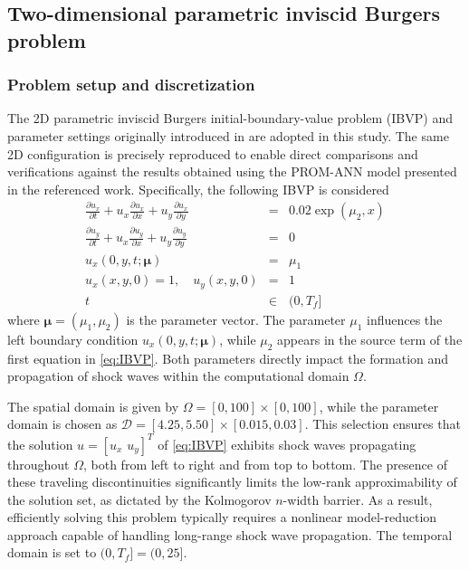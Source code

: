 \documentclass[preprint,10pt]{elsarticle}
\begin{document}
\subsection{Two-dimensional parametric inviscid Burgers problem}
\label{sec:Burgers}

\subsubsection{Problem setup and discretization}

The 2D parametric inviscid Burgers initial-boundary-value problem (IBVP) and parameter settings originally introduced in \cite{barnett2023neural} are adopted in 
this study. The same 2D configuration is precisely reproduced to enable direct comparisons and verifications against the results obtained using the PROM-ANN model presented in 
the referenced work. Specifically, the following IBVP is considered
\begin{eqnarray}
	\label{eq:IBVP}
	\frac{\partial u_x}{\partial t} + u_x\frac{\partial u_x}{\partial x} + u_y \frac{\partial u_x}{\partial y} &=& 0.02 \exp(\mu_2 ,x)
	\nonumber\\
	\frac{\partial u_y}{\partial t} + u_x\frac{\partial u_y}{\partial x} + u_y \frac{\partial u_y}{\partial y} &=& 0
	\\
	u_x(0, y, t; \boldsymbol{\mu}) &=& \mu_1 \nonumber \\
	u_x(x,y,0) = 1, \quad u_y(x,y,0) &=& 1  \nonumber \\
	t &\in& (0, T_f] \nonumber
\end{eqnarray}
where $\boldsymbol{\mu} = (\mu_1, \mu_2)$ is the parameter vector. The parameter $\mu_1$ influences the left boundary condition $u_x(0,y,t; \boldsymbol{\mu})$, while $\mu_2$ appears in the source term of the first equation in \eqref{eq:IBVP}. Both parameters directly impact the formation and propagation of shock waves within the computational domain $\Omega$.

The spatial domain is given by $\Omega = [0, 100] \times [0, 100]$, while the parameter domain is chosen as $\mathcal{D} = [4.25, 5.50] \times [0.015, 0.03]$. This selection ensures that the solution $u = [u_x \,\, u_y]^T$ of \eqref{eq:IBVP} exhibits shock waves propagating throughout $\Omega$, both from left to right and from top to bottom. The presence of these traveling discontinuities significantly limits the low-rank approximability of the solution set, as dictated by the Kolmogorov $n$-width barrier. As a result, efficiently solving this problem typically requires a nonlinear model-reduction approach capable of handling long-range shock wave propagation. The temporal domain is set to $(0, T_f] = (0, 25]$.
\end{document}
